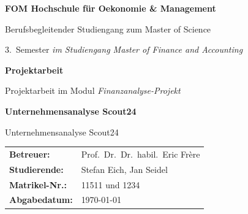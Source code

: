 
\begin{titlepage}
\thispagestyle{empty}

\centering

\vspace*{1.8cm}

{\Large \textbf{FOM Hochschule für Oekonomie \& Management}\par}
\vspace{0.3cm}
{\Large Berufsbegleitender Studiengang zum Master of Science\par}
\vspace{1.2cm}

{\large 3.\ Semester \textit{im Studiengang Master of Finance and Accounting}\par}
\vspace{1.2cm}

{\Large \textbf{Projektarbeit}\par}
\vspace{0.4cm}
{\Large Projektarbeit im Modul \textit{Finanzanalyse-Projekt}\par}
\vspace{1.2cm}

{\LARGE \textbf{Unternehmensanalyse Scout24}\par}
\vspace{0.4cm}
{\Large Unternehmensanalyse Scout24\par}
\vspace{1.6cm}

\begin{tabular}{@{}p{4.2cm}p{10.8cm}@{}}
\textbf{Betreuer:}     & Prof.\ Dr.\ Dr.\ habil.\ Eric Fr\`ere \\
\textbf{Studierende:}  & Stefan Eich, Jan Seidel \\
\textbf{Matrikel-Nr.:} & 11511 und 1234 \\
\textbf{Abgabedatum:}  & \today \\
\end{tabular}

\vfill

\par
\clearpage
\end{titlepage}